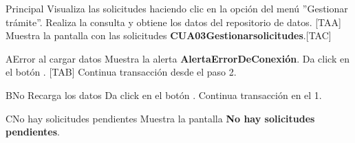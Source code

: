 \begin{UCtrayectoria}{Principal}
  \UCpaso[\UCactor] Visualiza las solicitudes haciendo clic en la opción del menú ''Gestionar trámite''.
  \UCpaso Realiza la consulta y obtiene los datos del repositorio de datos. [TAA]
  \UCpaso Muestra la pantalla con las solicitudes {\bf CUA03Gestionarsolicitudes}.[TAC]
\end{UCtrayectoria}

\begin{UCtrayectoriaA}{A}{Error al cargar datos} 
\UCpaso Muestra la alerta {\bf AlertaErrorDeConexión}.
  \UCpaso[\UCactor] Da click en el botón . [TAB]
  \UCpaso Continua transacción desde el paso 2.
\end{UCtrayectoriaA}

\begin{UCtrayectoriaA}{B}{No Recarga los datos} 
  \UCpaso Da click en el botón .
  \UCpaso Continua transacción en el 1.
\end{UCtrayectoriaA}

\begin{UCtrayectoriaA}{C}{No hay solicitudes pendientes} 
  \UCpaso Muestra la pantalla {\bf No hay solicitudes pendientes}.
\end{UCtrayectoriaA}

